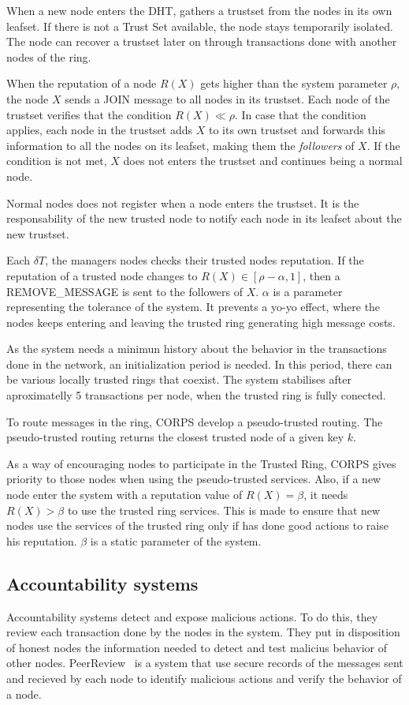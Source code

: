 When a new node enters the DHT, gathers a trustset from the nodes in its own
leafset. If there is not a Trust Set available, the node stays temporarily
isolated. The node can recover a trustset later on through transactions done with
another nodes of the ring.

When the reputation of a node $R(X)$ gets higher than the system parameter
$\rho$, the node $X$ sends a JOIN message to all nodes in its trustset. Each
node of the trustset verifies that the condition $R(X) \ll \rho$. In case that
the condition  applies, each node in the trustset adds $X$ to its own trustset
and forwards this information to all the nodes on its leafset, making them the
\textit{followers} of $X$.
If the condition is not met, $X$ does not enters the trustset and continues
being a normal node.

Normal nodes does not register when a node enters the trustset. It is the
responsability of the new trusted node to notify each node in its leafset about
the new trustset.

Each $\delta T$, the managers nodes checks their trusted nodes reputation. If
the reputation of a trusted node changes to $R(X) \in [\rho -\alpha, 1]$, then
a REMOVE\_MESSAGE is sent to the followers of $X$. $\alpha$ is a parameter
representing the tolerance of the system. It prevents a yo-yo effect, where the nodes keeps entering and
leaving the trusted ring generating high message costs.

As the system needs a minimun history about the behavior in the transactions
done in the network, an initialization period is needed. In this period, there
can be various locally trusted rings that coexist. The system stabilises after
aproximatelly 5 transactions per node, when the trusted ring is fully conected.

To route messages in the ring, CORPS develop a pseudo-trusted routing. The
pseudo-trusted routing returns the closest trusted node of a given key $k$.

As a way of encouraging nodes to participate in the Trusted Ring, CORPS gives
priority to those nodes when using the pseudo-trusted services.
Also, if a new node enter the system with a reputation value of $R(X) =
\beta$, it needs $R(X) > \beta$ to use the trusted ring services. This is
made to ensure that new nodes use the services of the trusted ring only if has done
good actions to raise his reputation. $\beta$ is a static parameter of the
system. 


\subsection{Accountability systems}
Accountability systems detect and expose malicious actions.
To do this, they review each transaction done by the nodes in the system. They
put in disposition of honest nodes the information needed to detect and test
malicius behavior of other nodes. PeerReview~\cite{haeberlen2007peerreview} is a system that
use secure records of the messages sent and recieved by each node to identify
malicious actions and verify the behavior of a node.

